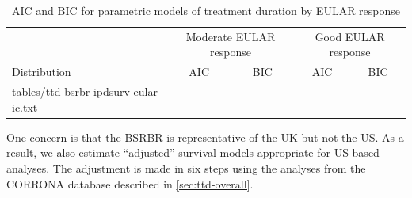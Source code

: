 \documentclass[11pt,final,fleqn]{article}
\makeatletter
\theoremstyle{plain}
\newcommand*\ExpandableInput[1]{\@@input#1 }
\makeatother
\begin{document}
\begin{table}[!ht]
\begin{center}
\begin{threeparttable}
\caption{AIC and BIC for parametric models of treatment duration by EULAR response} \label{tbl:ic-dur-eular}
\begin{tabularx}{\textwidth}{@{\extracolsep{\fill}}lcccc}
\hline
\multicolumn{1}{l}{} & \multicolumn{2}{c}{Moderate EULAR response} & \multicolumn{2}{c}{Good EULAR response} \\
\cmidrule{2-3} \cmidrule{4-5}
\multicolumn{1}{l}{Distribution} & \multicolumn{1}{c}{AIC} & \multicolumn{1}{c}{BIC} & \multicolumn{1}{c}{AIC}  & \multicolumn{1}{c}{BIC}   \\
\hline
\ExpandableInput{tables/ttd-bsrbr-ipdsurv-eular-ic.txt}
\hline
\end{tabularx}
\end{threeparttable}
\end{center}
\end{table}

One concern is that the BSRBR is representative of the UK but not the US. As a result, we also estimate ``adjusted'' survival models appropriate for US based analyses. The adjustment is made in six steps using the analyses from the CORRONA database described in \autoref{sec:ttd-overall}. 
\end{document}
